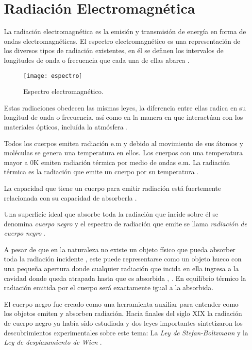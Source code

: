     \section{Radiación Electromagnética}
    La radiación electromagnética es la emisión y transmisión de energía en forma de ondas electromagnéticas. El espectro electromagnético es una representación de los diversos tipos de radiación existentes, en él se definen los intervalos de longitudes de onda o frecuencia que cada una de ellas abarca \cite{Chang}.
            \begin{figure}[hbtp]
                \centering
                \texttt{[image: espectro]}
                \caption{Espectro electromagnético.}
                \label{fig:espectro}
            \end{figure}    
    
    Estas radiaciones obedecen las mismas leyes, la diferencia entre ellas radica en su longitud de onda o frecuencia, así como en la manera en que interactúan con los materiales ópticos, incluída la atmósfera \cite{Vincent}.
    
    Todos los cuerpos emiten radiación e.m  y debido al movimiento de sus átomos y moléculas se genera una temperatura en ellos. Los cuerpos con una temperatura mayor a 0K emiten radiación térmica por medio de ondas e.m. La radiación térmica es la radiación que emite un cuerpo por su temperatura \cite{Hollands}.
    
    La capacidad que tiene un cuerpo para emitir radiación está fuertemente relacionada con su capacidad de absorberla \cite{Beiser}.
    
    Una superficie ideal que absorbe toda la radiación que incide sobre él se denomina \textit{cuerpo negro} y el espectro de radiación que emite se llama \textit{radiación de cuerpo negro} \cite{Sears}.
    
    A pesar de que en la naturaleza no existe un objeto físico que pueda absorber toda la radiación incidente \cite{FUV3}, este puede representarse como un objeto hueco con una pequeña apertura donde cualquier radiación que incida en ella ingresa a la cavidad donde queda atrapada hasta que es absorbida \cite{Beiser}, \cite{FUV3}. En equilibrio térmico la radiación emitida por el cuerpo será exactamente igual a la absorbida.
    
    El cuerpo negro fue creado como una herramienta auxiliar para entender como los objetos emiten y absorben radiación.
    Hacia finales del siglo XIX la radiación de cuerpo negro ya había sido estudiada y dos leyes importantes sintetizaron los descubrimientos experimentales sobre este tema: La \textit{Ley de Stefan-Boltzmann} y la \textit{Ley de desplazamiento de Wien} \cite{FUV3}.
    
